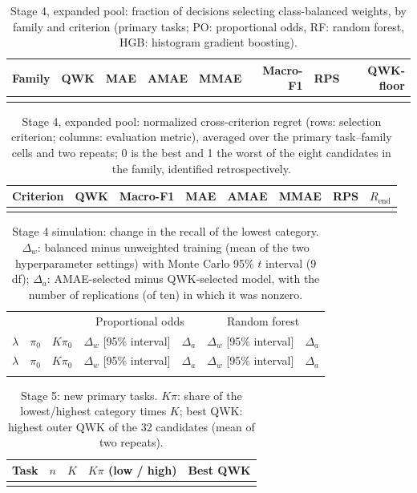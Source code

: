 \documentclass[10pt]{article}
\begin{document}
{\footnotesize
\begin{longtable}{@{}l*{7}{r}@{}}
\caption{Stage 4, expanded pool: fraction of decisions selecting class-balanced weights, by family and criterion (primary tasks; PO: proportional odds, RF: random forest, HGB: histogram gradient boosting).}\label{tab:s-stage4-balance}\\
\toprule
Family & QWK & MAE & AMAE & MMAE & Macro-F1 & RPS & QWK-floor\\
\midrule\endfirsthead
\bottomrule\endfoot

\end{longtable}
}

{\footnotesize
\begin{longtable}{@{}l*{7}{r}@{}}
\caption{Stage 4, expanded pool: normalized cross-criterion regret (rows: selection criterion; columns: evaluation metric), averaged over the primary task--family cells and two repeats; 0 is the best and 1 the worst of the eight candidates in the family, identified retrospectively.}\label{tab:s-stage4-regret}\\
\toprule
Criterion & QWK & Macro-F1 & MAE & AMAE & MMAE & RPS & $R_{\mathrm{end}}$\\
\midrule\endfirsthead
\bottomrule\endfoot

\end{longtable}
}

{\footnotesize
\begin{longtable}{@{}rrrllll@{}}
\caption{Stage 4 simulation: change in the recall of the lowest category. $\Delta_w$: balanced minus unweighted training (mean of the two hyperparameter settings) with Monte Carlo 95\% $t$ interval (9 df); $\Delta_a$: AMAE-selected minus QWK-selected model, with the number of replications (of ten) in which it was nonzero.}\label{tab:s-stage4-sim}\\
\toprule
& & & \multicolumn{2}{c}{Proportional odds} & \multicolumn{2}{c}{Random forest}\\
$\lambda$ & $\pi_0$ & $K\pi_0$ & $\Delta_w$ [95\% interval] & $\Delta_a$ & $\Delta_w$ [95\% interval] & $\Delta_a$\\
\midrule\endfirsthead
\toprule
$\lambda$ & $\pi_0$ & $K\pi_0$ & $\Delta_w$ [95\% interval] & $\Delta_a$ & $\Delta_w$ [95\% interval] & $\Delta_a$\\
\midrule\endhead
\bottomrule\endfoot

\end{longtable}
}

{\footnotesize
\begin{longtable}{@{}lrrll@{}}
\caption{Stage 5: new primary tasks. $K\pi$: share of the lowest/highest category times $K$; best QWK: highest outer QWK of the 32 candidates (mean of two repeats).}\label{tab:s-stage5-tasks}\\
\toprule
Task & $n$ & $K$ & $K\pi$ (low / high) & Best QWK\\
\midrule\endfirsthead
\bottomrule\endfoot

\end{longtable}
}
\end{document}

